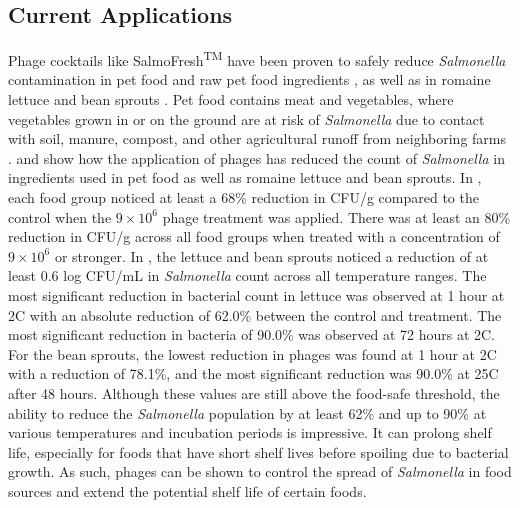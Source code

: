 \subsection{Current Applications}
Phage cocktails like SalmoFresh\textsuperscript{TM} have been proven to safely reduce \textit{Salmonella} contamination in pet food and raw pet food ingredients \cite{sofferBacteriophagesSafelyReduce2016}, as well as in romaine lettuce and bean sprouts \cite{zhangSalmoFreshEffectivenessControlling2019}.
Pet food contains meat and vegetables, where vegetables grown in or on the ground are at risk of \textit{Salmonella} due to contact with soil, manure, compost, and other agricultural runoff from neighboring farms \cite{kowalskaFreshVegetablesFruit2023}.
 and  show how the application of phages has reduced the count of \textit{Salmonella} in ingredients used in pet food as well as romaine lettuce and bean sprouts. 
In , each food group noticed at least a 68\% reduction in CFU/g compared to the control when the $9\times 10^6$ phage treatment was applied. 
There was at least an 80\% reduction in CFU/g across all food groups when treated with a concentration of $9\times 10^6$ or stronger. 
In , the lettuce and bean sprouts noticed a reduction of at least 0.6 log CFU/mL in \textit{Salmonella} count across all temperature ranges. 
The most significant reduction in bacterial count in lettuce was observed at 1 hour at 2\textdegree C with an absolute reduction of 62.0\% between the control and treatment. 
The most significant reduction in bacteria of 90.0\% was observed at 72 hours at 2\textdegree C. 
For the bean sprouts, the lowest reduction in phages was found at 1 hour at 2\textdegree C with a reduction of 78.1\%, and the most significant reduction was 90.0\% at 25\textdegree C after 48 hours. 
Although these values are still above the food-safe threshold, the ability to reduce the \textit{Salmonella} population by at least 62\% and up to 90\% at various temperatures and incubation periods is impressive. It can prolong shelf life, especially for foods that have short shelf lives before spoiling due to bacterial growth. 
As such, phages can be shown to control the spread of \textit{Salmonella} in food sources and extend the potential shelf life of certain foods. 

